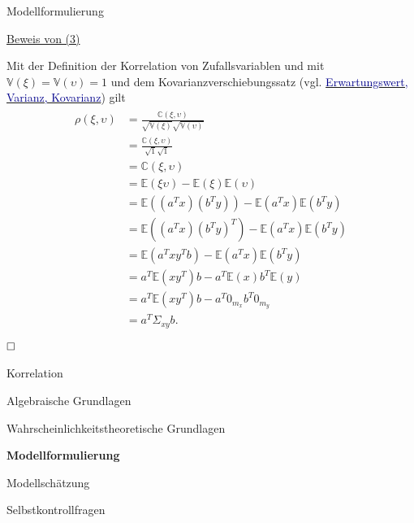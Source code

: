\documentclass[
  8pt,
  ignorenonframetext,
]{beamer}
\begin{document}
\begin{frame}{Modellformulierung}
\protect\hypertarget{modellformulierung-2}{}
\footnotesize

\underline{Beweis von (3)}

Mit der Definition der Korrelation von Zufallsvariablen und mit
\(\mathbb{V}(\xi) = \mathbb{V}(\upsilon) = 1\) und dem
Kovarianzverschiebungssatz (vgl.
\href{https://youtu.be/613-3a1Pyyg}{\textcolor{darkblue}{Erwartungswert, Varianz, Kovarianz}})
gilt \begin{align}
\begin{split}
\rho(\xi,\upsilon)
& = \frac{\mathbb{C}(\xi,\upsilon)}{\sqrt{\mathbb{V}(\xi)}\sqrt{\mathbb{V}(\upsilon)}} \\
& = \frac{\mathbb{C}(\xi,\upsilon)}{\sqrt{1}\sqrt{1}} \\
& = \mathbb{C}(\xi,\upsilon) \\
& = \mathbb{E}(\xi\upsilon) - \mathbb{E}(\xi)\mathbb{E}(\upsilon) \\
& = \mathbb{E}\left((a^Tx)(b^Ty)\right) - \mathbb{E}(a^Tx)\mathbb{E}(b^Ty) \\
& = \mathbb{E}\left((a^Tx)(b^Ty)^T\right) - \mathbb{E}(a^Tx)\mathbb{E}(b^Ty) \\
& = \mathbb{E}\left(a^T xy^Tb \right) - \mathbb{E}(a^Tx)\mathbb{E}(b^Ty) \\
& = a^T\mathbb{E}\left(xy^T \right)b - a^T\mathbb{E}(x)b^T\mathbb{E}(y) \\
& = a^T\mathbb{E}\left(xy^T \right)b - a^T0_{m_x}b^T0_{m_y} \\
& = a^T\Sigma_{xy}b. \\
\end{split}
\end{align} \(\hfill\Box\)
\end{frame}

\begin{frame}{}
\protect\hypertarget{section-7}{}
\vfill
\large

Korrelation

Algebraische Grundlagen

Wahrscheinlichkeitstheoretische Grundlagen

\textbf{Modellformulierung}

Modellschätzung

Selbstkontrollfragen \vfill
\end{frame}
\end{document}
